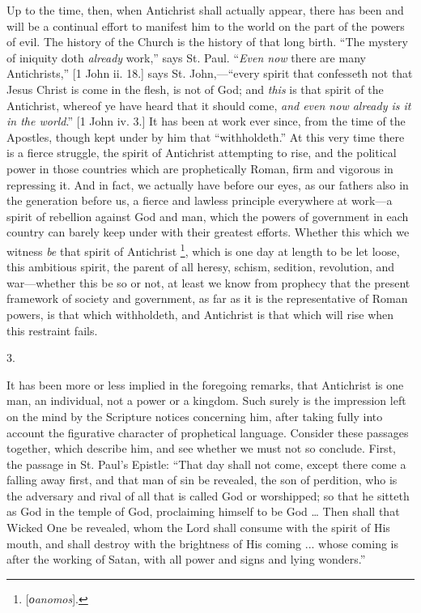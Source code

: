 Up to the time, then, when Antichrist shall actually appear, there
has been and will be a continual effort to manifest him to the world
on the part of the powers of evil. The history of the Church is
the history of that long birth. ``The mystery of iniquity doth \emph{already}
work,'' says St. Paul. ``\emph{Even now} there are many
Antichrists,'' [1 John ii. 18.] says St. John,—``every
spirit that confesseth not that Jesus Christ is come in the flesh, is
not of God; and \emph{this} is that spirit of the Antichrist, whereof ye have
heard that it should come, \emph{and even now already is it in the world}.''
[1 John iv. 3.] It has been at work ever since, from the time of the
Apostles, though kept under by him that ``withholdeth.'' At
this very time there is a fierce struggle, the spirit of Antichrist
attempting to rise, and the political power in those countries which
are prophetically Roman, firm and vigorous in repressing it. And in
fact, we actually have before our eyes, as our fathers also in the
generation before us, a fierce and lawless principle everywhere at
work—a spirit of rebellion against God and man, which the powers of
government in each country can barely keep under with their greatest
efforts. Whether this which we witness \emph{be} that spirit of
Antichrist \footnote{[\emph{ο}\emph{anomos}].}, which is one
day at length to be let loose, this ambitious spirit, the parent of
all heresy, schism, sedition, revolution, and war—whether this be so
or not, at least we know from prophecy that the present framework of
society and government, as far as it is the representative of Roman
powers, is that which withholdeth, and Antichrist is that which will
rise when this restraint fails.

3.

It has been more or less implied in the foregoing remarks, that
Antichrist is one man, an individual, not a power or a kingdom. Such
surely is the impression left on the mind by the Scripture notices
concerning him, after taking fully into account the figurative
character of prophetical language. Consider these passages
together, which describe him, and see whether we must not so conclude.
First, the passage in St. Paul's Epistle: ``That day shall not
come, except there come a falling away first, and that man of sin be
revealed, the son of perdition, who is the adversary and rival of all
that is called God or worshipped; so that he sitteth as God in the
temple of God, proclaiming himself to be God … Then shall that
Wicked One be revealed, whom the Lord shall consume with the spirit of
His mouth, and shall destroy with the brightness of His coming ...
whose coming is after the working of Satan, with all power and signs
and lying wonders.''

